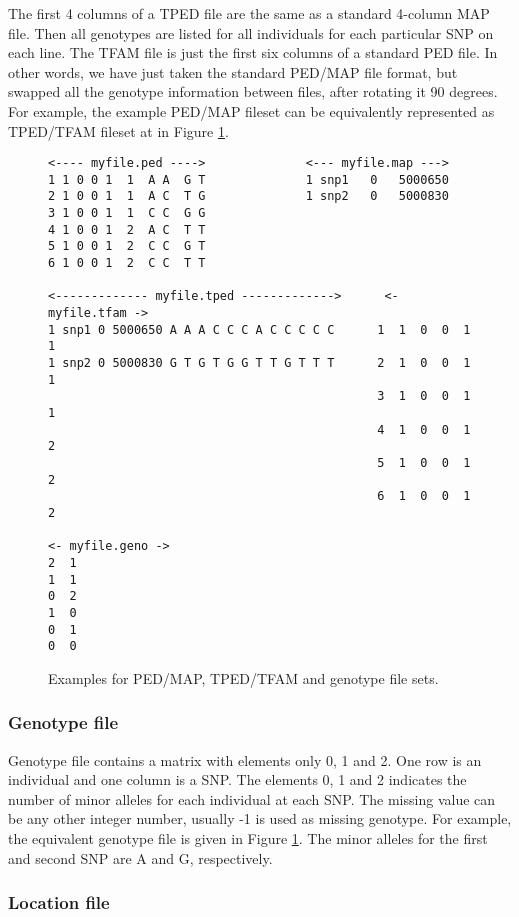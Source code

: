 \documentclass[12pt]{article}
\begin{document}
The first 4 columns of a TPED file are the same as a standard 4-column MAP file. Then all genotypes
are listed for all individuals for each particular SNP on each line. The TFAM file is just the first
six columns of a standard PED file. In other words, we have just taken the standard PED/MAP file
format, but swapped all the genotype information between files, after rotating it 90 degrees. For
example, the example PED/MAP fileset can be equivalently represented as TPED/TFAM fileset at in
Figure \ref{fig:ped_example}.


\begin{figure}
\begin{center}
\begin{verbatim}
<---- myfile.ped ---->              <--- myfile.map --->
1 1 0 0 1  1  A A  G T              1 snp1   0   5000650
2 1 0 0 1  1  A C  T G              1 snp2   0   5000830
3 1 0 0 1  1  C C  G G
4 1 0 0 1  2  A C  T T
5 1 0 0 1  2  C C  G T
6 1 0 0 1  2  C C  T T

<------------- myfile.tped ------------->      <- myfile.tfam ->
1 snp1 0 5000650 A A A C C C A C C C C C      1  1  0  0  1  1
1 snp2 0 5000830 G T G T G G T T G T T T      2  1  0  0  1  1
                                              3  1  0  0  1  1
                                              4  1  0  0  1  2
                                              5  1  0  0  1  2
                                              6  1  0  0  1  2

<- myfile.geno ->
2  1
1  1
0  2
1  0
0  1
0  0
\end{verbatim} 
\end{center}
\caption{Examples for PED/MAP, TPED/TFAM and genotype file sets.}\label{fig:ped_example}
\end{figure}

\subsubsection*{Genotype file}

Genotype file contains a matrix with elements only 0, 1 and 2. One row is an individual and one
column is a SNP. The elements 0, 1 and 2 indicates the number of minor alleles for each individual
at each SNP. The missing value can be any other integer number, usually -1 is used as missing
genotype. For example, the equivalent genotype file is given in Figure \ref{fig:ped_example}.  
The minor alleles for the first and second SNP are A and G, respectively.

\subsubsection*{Location file}
\end{document}
